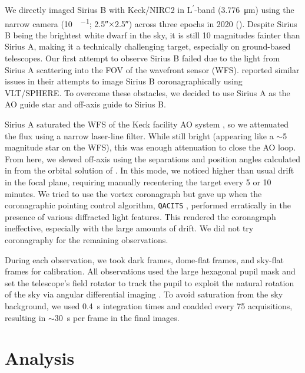 \documentclass[twocolumn]{aastex631}
\newcommand\Lp{$\mathrm{L}^\prime$}
\begin{document}
We directly imaged Sirius B with Keck/NIRC2 in \Lp-band (\qty{3.776}{\micro\meter}) using the narrow camera (\qty{10}{\milliarcsecond\per\pixel}; \ang{;;2.5}$\times$\ang{;;2.5}) across three epochs in 2020 (). Despite Sirius B being the brightest white dwarf in the sky, it is still 10 magnitudes fainter than Sirius A, making it a technically challenging target, especially on ground-based telescopes. Our first attempt to observe Sirius B failed due to the light from Sirius A scattering into the FOV of the wavefront sensor (WFS). \citet[Sec.~2]{viganHighcontrastImagingSirius2015} reported similar issues in their attempts to image Sirius B coronagraphically using VLT/SPHERE. To overcome these obstacles, we decided to use Sirius A as the AO guide star and off-axis guide to Sirius B.

Sirius A saturated the WFS of the Keck facility AO system \citep{wizinowichPerformanceKeckObservatory2000}, so we attenuated the flux using a narrow laser-line filter. While still bright (appearing like a $\sim$5 magnitude star on the WFS), this was enough attenuation to close the AO loop. From here, we slewed off-axis using the separations and position angles calculated in  from the orbital solution of \citet{bondSiriusSystemIts2017}. In this mode, we noticed higher than usual drift in the focal plane, requiring manually recentering the target every 5 or 10 minutes. We tried to use the vortex coronagraph \citep{serabynKeckObservatoryInfrared2017} but gave up when the coronagraphic pointing control algorithm, \texttt{QACITS} \citep{hubyOnskyPerformanceQACITS2017a}, performed erratically in the presence of various diffracted light features. This rendered the coronagraph ineffective, especially with the large amounts of drift. We did not try coronagraphy for the remaining observations.

During each observation, we took dark frames, dome-flat frames, and sky-flat frames for calibration. All observations used the large hexagonal pupil mask and set the telescope's field rotator to track the pupil to exploit the natural rotation of the sky via angular differential imaging \citep[ADI;][]{maroisAngularDifferentialImaging2006}. To avoid saturation from the sky background, we used \qty{0.4}{\second} integration times and coadded every \num{75} acquisitions, resulting in $\sim$\qty{30}{\second} per frame in the final images.

\section{Analysis}\label{sec:analysis}
\end{document}
